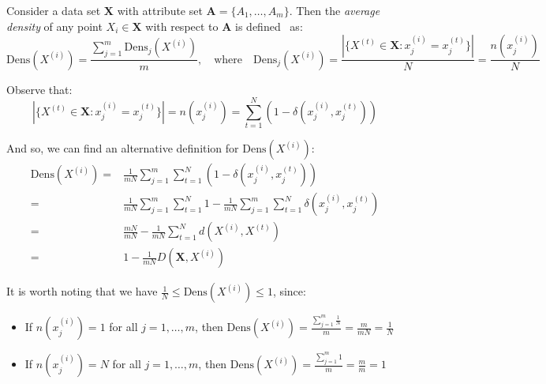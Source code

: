 \begin{definition}\label{def:density}	
    Consider a data set \(\textbf{X}\) with attribute set \(\textbf{A} = 
    \{A_1, \ldots, A_m\}\). Then the \emph{average density} of any point 
    \(X_i \in \textbf{X}\) with respect to \(\textbf{A}\) is 
    defined~\cite{Cao2009} as:
	\[
	    \text{Dens}(X^{(i)}) = \frac{\sum_{j=1}^m \text{Dens}_{j}(X^{(i)})}{m}, 
        \quad \text{where} \quad \text{Dens}_{j}(X^{(i)}) = \frac{|\{X^{(t)} \in 
        \textbf{X} : x_j^{(i)} = x_j^{(t)}\}|}{N} = \frac{n(x_j^{(i)})}{N}
	\]

    Observe that:
    \[
	    |\{X^{(t)} \in \textbf{X} : x_j^{(i)} = x_j^{(t)}\}| = n(x_j^{(i)}) = 
	    \sum_{t=1}^N (1 - \delta(x_j^{(i)}, x_j^{(t)}))
    \]

    And so, we can find an alternative definition for \(\text{Dens}(X^{(i)})\):
    \begin{equation}\label{eq:alt-def}
    \begin{aligned}
        \text{Dens}(X^{(i)}) = {} & {} \frac{1}{mN} \sum_{j=1}^m \sum_{t=1}^N (1
        - \delta(x_j^{(i)}, x_j^{(t)}))
        \\
        = {} & {} \frac{1}{mN} \sum_{j=1}^m \sum_{t=1}^N 1 - \frac{1}{mN}
        \sum_{j=1}^m \sum_{t=1}^N \delta(x_j^{(i)}, x_j^{(t)})
        \\
        = {} & {} \frac{mN}{mN} - \frac{1}{mN} \sum_{t=1}^N d(X^{(i)}, X^{(t)})
        \\
        = {} & {} 1 - \frac{1}{mN} D(\textbf{X}, X^{(i)})
    \end{aligned}
    \end{equation}
\end{definition}

\begin{remark}
    It is worth noting that we have \(\frac{1}{N} \leq \text{Dens}(X^{(i)})
    \leq 1\), since:		
	\begin{itemize}	
        \item If \(n(x_j^{(i)}) = 1\) for all \(j = 1, \ldots, m\), then
            \(\text{Dens}(X^{(i)}) = \frac{\sum_{j=1}^m \frac{1}{N}}{m} =
            \frac{m}{mN} = \frac{1}{N}\)
        \item If \(n(x_j^{(i)}) = N\) for all \(j = 1, \ldots, m\), then
            \(\text{Dens}(X^{(i)}) = \frac{\sum_{j=1}^m 1}{m} = \frac{m}{m} =
            1\)
	\end{itemize}
\end{remark}

\begin{singlespace}
    
\end{singlespace}

